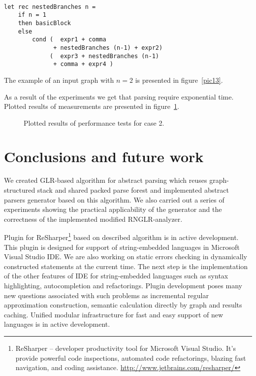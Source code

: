 \documentclass{acm_proc_article-sp}
\begin{document}
\begin{verbatim}

let rec nestedBranches n =
    if n = 1
    then basicBlock
    else 
        cond (  expr1 + comma 
              + nestedBranches (n-1) + expr2) 
             (  expr3 + nestedBranches (n-1) 
              + comma + expr4 )
\end{verbatim}

The example of an input graph with $n = 2$ is presented in figure~\ref{pic13}.

\begin{figure*}
    \centering
    \caption{Example of graph for nested branches with $n = 2$.}
    \label{pic13}
\end{figure*}


As a result of the experiments we get that parsing require exponential time. Plotted results of measurements are presented in figure~\ref{pic14}.

\begin{figure}
    \centering
    \caption{Plotted results of performance tests for case 2.}
    \label{pic14}
\end{figure}



\section{Conclusions and future work}

We created GLR-based algorithm for abstract parsing which reuses graph-structured stack and shared packed parse forest and implemented abstract parsers generator based on this algorithm. We also carried out a series of experiments showing the practical applicability of the generator and the correctness of the implemented modified RNGLR-analyzer.

Plugin for ReSharper\footnote{ReSharper -- developer productivity tool for Microsoft Visual Studio. It's provide powerful code inspections, automated code refactorings, blazing fast navigation, and coding assistance.  \href{http://www.jetbrains.com/resharper/}{http://www.jetbrains.com/resharper/}} based on described algorithm is in active development. This plugin is designed for support of  string-embedded languages in  Microsoft Visual Studio IDE. We are also working on static errors checking in dynamically constructed statements at the current time. The next step is the implementation of the other features of IDE for string-embedded languages such as syntax highlighting, autocompletion and refactorings. Plugin development poses many new questions associated with such problems as incremental regular approximation construction, semantic calculation directly by graph and results caching. Unified modular infrastructure for fast and easy support of new languages is in active development.
\end{document}
